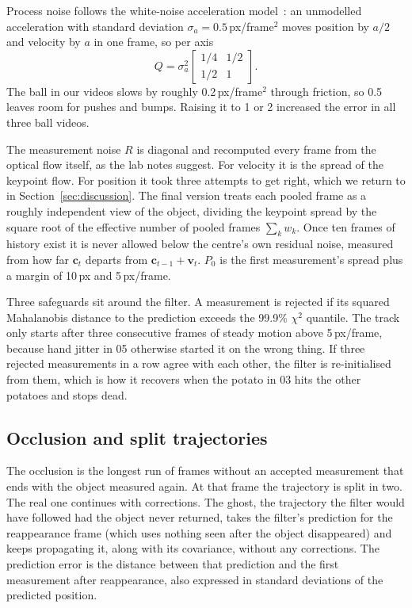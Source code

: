 \documentclass[conference]{assets/latex/IEEEtran}
\begin{document}
Process noise follows the white-noise acceleration model~\cite{barshalom2001}: an unmodelled acceleration with standard deviation $\sigma_a = 0.5$\,px/frame$^2$ moves position by $a/2$ and velocity by $a$ in one frame, so per axis
\begin{equation}
Q = \sigma_a^2 \begin{bmatrix} 1/4 & 1/2 \\ 1/2 & 1 \end{bmatrix}.
\end{equation}
The ball in our videos slows by roughly 0.2\,px/frame$^2$ through friction, so 0.5 leaves room for pushes and bumps. Raising it to 1 or 2 increased the error in all three ball videos.

The measurement noise $R$ is diagonal and recomputed every frame from the optical flow itself, as the lab notes suggest. For velocity it is the spread of the keypoint flow. For position it took three attempts to get right, which we return to in Section~\ref{sec:discussion}. The final version treats each pooled frame as a roughly independent view of the object, dividing the keypoint spread by the square root of the effective number of pooled frames $\sum_k w_k$. Once ten frames of history exist it is never allowed below the centre's own residual noise, measured from how far $\mathbf{c}_t$ departs from $\mathbf{c}_{t-1} + \mathbf{v}_t$. $P_0$ is the first measurement's spread plus a margin of 10\,px and 5\,px/frame.

Three safeguards sit around the filter. A measurement is rejected if its squared Mahalanobis distance to the prediction exceeds the 99.9\% $\chi^2$ quantile. The track only starts after three consecutive frames of steady motion above 5\,px/frame, because hand jitter in 05 otherwise started it on the wrong thing. If three rejected measurements in a row agree with each other, the filter is re-initialised from them, which is how it recovers when the potato in 03 hits the other potatoes and stops dead.

\subsection{Occlusion and split trajectories}

The occlusion is the longest run of frames without an accepted measurement that ends with the object measured again. At that frame the trajectory is split in two. The real one continues with corrections. The ghost, the trajectory the filter would have followed had the object never returned, takes the filter's prediction for the reappearance frame (which uses nothing seen after the object disappeared) and keeps propagating it, along with its covariance, without any corrections. The prediction error is the distance between that prediction and the first measurement after reappearance, also expressed in standard deviations of the predicted position.
\end{document}
